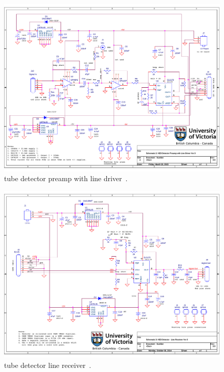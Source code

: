 \begin{figure}
	\centering
		\includegraphics[width=\paperwidth]{images/linedrive}
	\caption[\He tube detector preamp with line driver]{\He tube detector preamp with line driver~\cite{Honkanen}.}
	\label{fig:he3preampLineDriver}
\end{figure}

\begin{figure}
	\centering
		\includegraphics[width=\paperwidth]{images/linerecieve}
	\caption[\He tube detector line receiver]{\He tube detector line receiver~\cite{Honkanen}.}
	\label{fig:he3LineReciever}
\end{figure}



